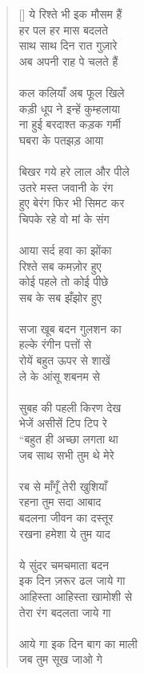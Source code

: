 \begin{verse}[\versewidth]\texthindi{
ये रिश्ते भी इक मौसम हैं\\
हर पल हर मास बदलते\\
साथ साथ दिन रात गुज़ारे\\
अब अपनी राह पे चलते हैं\\
\\
कल कलियाँ अब फूल खिले\\
कड़ी धूप ने इन्हें कुम्हलाया\\
ना हुई बरदाश्त कड़क गर्मी\\
घबरा के पतझड़ आया\\
\\
बिखर गये हरे लाल और पीले\\
उतरे मस्त जवानी के रंग\\
हुए बेरंग फिर भी सिमट कर\\
चिपके रहे वो मां के संग\\
\\
आया सर्द हवा का झोंका\\
रिश्ते सब कमज़ोर हुए\\
कोई पहले तो कोई पीछे\\
सब के सब झँझोर हुए\\
\\
सजा खूब बदन गुलशन का\\
हल्के रंगीन पत्तों से\\
रोयें बहुत ऊपर से शाखें\\
ले के आंसू शबनम से\\
\\
सुबह की पहली किरण देख\\
भेजें असीसें टिप टिप रे\\
“बहुत ही अच्छा लगता था\\
जब साथ सभी तुम थे मेरे\\
\\
रब से माँगूँ तेरी खुशियाँ\\
रहना तुम सदा आबाद\\
बदलना जीवन का दस्तूर\\
रखना हमेशा ये तुम याद\\
\\
ये सुंदर चमचमाता बदन\\
इक दिन ज़रूर ढल जाये गा\\
आहिस्ता आहिस्ता खामोशी से\\
तेरा रंग बदलता जाये गा\\
\\
आये गा इक दिन बाग का माली\\
जब तुम सूख जाओ गे\\
}
\end{verse}
